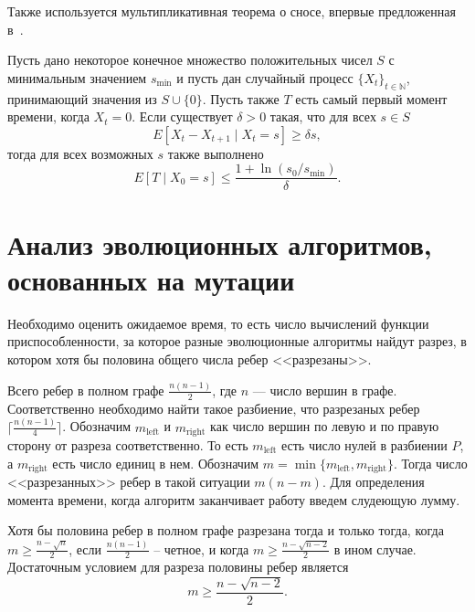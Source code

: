 \documentclass[times]{itmo-student-thesis}
\newcommand{\N}{{\mathbb N}}
\begin{document}
Также используется мультипликативная теорема о сносе, впервые предложенная в~\cite{DoerrJW10}.

\begin{theorem}\label{thm:mult-drift}
  Пусть дано некоторое конечное множество положительных чисел $S$ с минимальным значением $s_{\min}$ и пусть дан случайный процесс $\{X_t\}_{t \in \N}$, принимающий значения из $S \cup \{0\}$. Пусть также $T$ есть самый первый момент времени, когда $X_t = 0$. Если существует $\delta > 0$ такая, что для всех $s \in S$
  \[
    E\left[X_t - X_{t + 1} \mid X_t = s\right] \ge \delta s,
  \]
  тогда для всех возможных $s$ также выполнено
  \[
    E[T \mid X_0 = s] \le \frac{1 + \ln(s_0/s_{\min})}{\delta}.
  \]
\end{theorem}

\section{Анализ эволюционных алгоритмов, основанных на мутации}
Необходимо оценить ожидаемое время, то есть число вычислений функции приспособленности, за которое разные эволюционные алгоритмы найдут разрез, в котором хотя бы половина общего числа ребер <<разрезаны>>.

Всего ребер в полном графе $\frac{n(n-1)}{2}$, где $n$ --- число вершин в графе.
Соответственно необходимо найти такое разбиение, что разрезаных ребер $\lceil \frac{n(n-1)}{4} \rceil$.
Обозначим $m_{\text{left}}$ и $m_{\text{right}}$ как число вершин по левую и по правую сторону от разреза соответственно. То есть $m_{\text{left}}$ есть число нулей в разбиении $P$, а $m_{\text{right}}$ есть число единиц в нем.
Обозначим $m = \min\{m_{\text{left}}, m_{\text{right}}\}$.
Тогда число <<разрезанных>> ребер в такой ситуации $m(n-m)$. Для определения момента времени, когда алгоритм заканчивает работу введем слудеющую лумму.

\begin{lemma}
  Хотя бы половина ребер в полном графе разрезана тогда и только тогда, когда $m \ge \frac{n - \sqrt{n}}{2}$, если $\frac{n(n - 1)}{2}$ -- четное, и когда $m \ge \frac{n - \sqrt{n - 2}}{2}$ в ином случае. Достаточным условием для разреза половины ребер является
  \[
    m \ge \frac{n - \sqrt{n - 2}}{2}.
  \]
\end{lemma}
\end{document}
